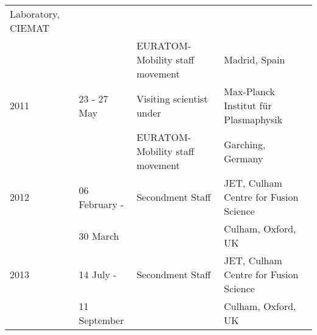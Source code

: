 {\begin{longtable}{llll}
Laboratory, CIEMAT \\
 & & EURATOM-Mobility
staff movement &  Madrid, Spain \\
2011 & 23 - 27 May & Visiting scientist under& Max-Planck
Institut f\"ur Plasmaphysik \\
 & & EURATOM-Mobility
staff movement &  Garching, Germany \\
2012 & 06 February -  & Secondment Staff & JET, Culham Centre for
Fusion Science \\
 & 30 March & &  Culham, Oxford, UK \\
2013 & 14 July -  & Secondment Staff & JET, Culham Centre for
Fusion Science \\
 & 11 September & &  Culham, Oxford, UK \\
\end{longtable}
}

